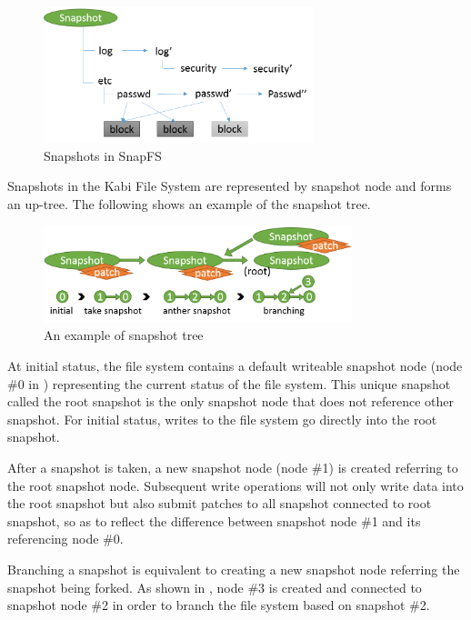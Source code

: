 \begin{figure}[hbtp]
\centering
\includegraphics[width=0.7\textwidth]{Chapter-4/figs/fig24.png}
\caption{Snapshots in SnapFS}
\label{fig:snapfs_approach}
\end{figure}

    Snapshots in the Kabi File System are represented by snapshot node and forms an up-tree. The following  shows an example of the snapshot tree.

\begin{figure}[hbtp]
\centering
\includegraphics[width=0.8\textwidth]{Chapter-4/figs/fig13.png}
\caption{An example of snapshot tree}
\label{fig:snap_tree_example}
\end{figure}

    At initial status, the file system contains a default writeable snapshot node (node \#0 in ) representing the current status of the file system. This unique snapshot called the root snapshot is the only snapshot node that does not reference other snapshot. For initial status, writes to the file system go directly into the root snapshot.
    
    After a snapshot is taken, a new snapshot node (node \#1) is created referring to the root snapshot node. Subsequent write operations will not only write data into the root snapshot but also submit patches to all snapshot connected to root snapshot, so as to reflect the difference between snapshot node \#1 and its referencing node \#0.

    Branching a snapshot is equivalent to creating a new snapshot node referring the snapshot being forked. As shown in , node \#3 is created and connected to snapshot node \#2 in order to branch the file system based on snapshot \#2.

